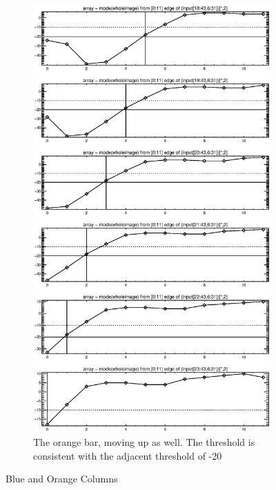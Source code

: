 \documentclass[10pt]{article}
\begin{document}
\begin{figure}[!h]
    \hspace{1.0in}
    \begin{subfigure}[b]{.4\linewidth}
        \centering
        \includegraphics[width=1.4\textwidth]{../plots_tables_images/botleft3.eps} 
        \caption{The orange bar, moving up as well. The threshold is consistent with the adjacent threshold of -20}
    \end{subfigure}
    \caption{Blue and Orange Columns}
    \label{secondone}
\end{figure}
\end{document}

